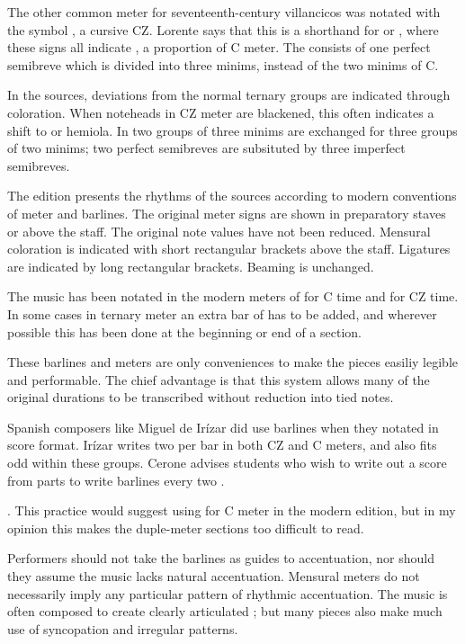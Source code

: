 The other common meter for seventeenth-century villancicos was notated with the symbol \meterCZ{}, a cursive CZ.
Lorente says that this is a shorthand for \meterCThree{} or \meterCThreeTwo{}, where these signs all indicate , a proportion of C meter.%
  \autocite[165]{Lorente:Porque}
The  consists of one perfect semibreve which is divided into three minims, instead of the two minims of C.

In the sources, deviations from the normal ternary groups are indicated through coloration. 
When noteheads in CZ meter are blackened, this often indicates a shift to  or hemiola.
In  two groups of three minims are exchanged for three groups of two minims; two perfect semibreves are subsituted by three imperfect semibreves.

The edition presents the rhythms of the sources according to modern conventions of meter and barlines.
The original meter signs are shown in preparatory staves or above the staff.
The original note values have not been reduced.
Mensural coloration is indicated with short rectangular brackets above the staff.
Ligatures are indicated by long rectangular brackets.
Beaming is unchanged.

The music has been notated in the modern meters of  for C time and  for CZ time.
In some cases in ternary meter an extra bar of  has to be added, and wherever possible this has been done at the beginning or end of a section.

These barlines and meters are only conveniences to make the pieces easiliy legible and performable.
The chief advantage is that this system allows many of the original durations to be transcribed without reduction into tied notes.

Spanish composers like Miguel de Irízar did use barlines when they notated in score format.
Irízar writes two  per bar in both CZ and C meters, and also fits odd  within these groups.
Cerone advises students who wish to write out a score from parts to write barlines every two .%
  \begin{Footnote}
  \autocite[745]{Cerone:Melopeo}.
  This practice would suggest using  for C meter in the modern edition, but in my opinion this makes the duple-meter sections too difficult to read.
  \end{Footnote}

Performers should not take the barlines as guides to accentuation, nor should they assume the music lacks natural accentuation.
Mensural meters do not necessarily imply any particular pattern of rhythmic accentuation.
The music is often composed to create clearly articulated ; but many pieces also make much use of syncopation and irregular patterns.

